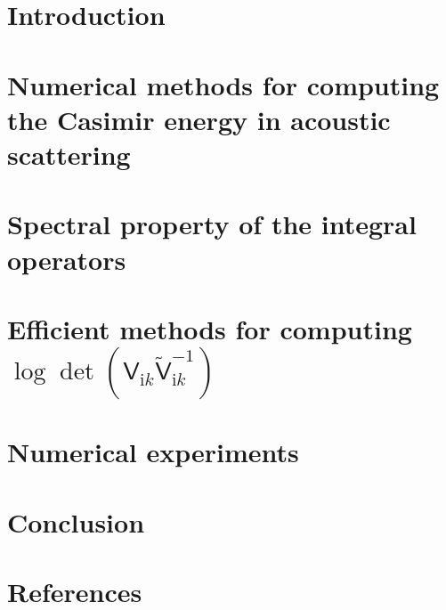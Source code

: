 \documentclass[review]{elsarticle}
\begin{document}
\section{Introduction}\label{Introduction}


\section{Numerical methods for computing the Casimir energy  in acoustic scattering}\label{Numerical methods for computing the Casimir energy}


\section{Spectral property of the integral operators}\label{Spectral property of the integral operators}


\section{Efficient methods for computing $\log\det(\mathsf{V}_{\mathrm{i}k}\tilde{\mathsf{V}}_{\mathrm{i}k}^{-1})$}\label{Krylov subspace for generalized eigenvalue problem}


\section{Numerical experiments}\label{Numerical experiments}


\section{Conclusion}\label{Conclusion}



\section*{References}


\end{document}
